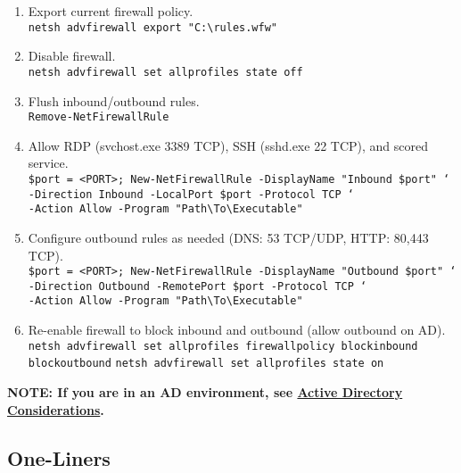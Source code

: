 \documentclass[12pt,letterpaper]{article}
\def\code#1{\textcolor{iris}{\texttt{#1}}}
\def\bf#1{\textbf{#1}}
\begin{document}
\begin{enumerate}
\begin{enumerate}
			\item Export current firewall policy. \\
				\code{netsh advfirewall export "C:\textbackslash{}rules.wfw"}
			\item Disable firewall. \\
				\code{netsh advfirewall set allprofiles state off}
			\item Flush inbound/outbound rules. \\
				\code{Remove-NetFirewallRule}
			\item Allow RDP (svchost.exe 3389 TCP), SSH (sshd.exe 22 TCP), and scored service. \\
				\code{\$port = <PORT>; New-NetFirewallRule -DisplayName "Inbound \$port" ` \\
				-Direction Inbound -LocalPort \$port -Protocol TCP ` \\
				-Action Allow -Program "Path\textbackslash{}To\textbackslash{}Executable"}
			\item Configure outbound rules as needed (DNS: 53 TCP/UDP, HTTP: 80,443 TCP). \\
				\code{\$port = <PORT>; New-NetFirewallRule -DisplayName "Outbound \$port" ` \\
				-Direction Outbound -RemotePort \$port -Protocol TCP ` \\
				-Action Allow -Program "Path\textbackslash{}To\textbackslash{}Executable"}
			\item Re-enable firewall to block inbound and outbound (allow outbound on AD). \\
				\code{netsh advfirewall set allprofiles firewallpolicy blockinbound blockoutbound}
				\code{netsh advfirewall set allprofiles state on}
		\end{enumerate}
	\bf{NOTE: If you are in an AD environment, see \hyperref[subsec:adcon]{Active Directory Considerations}.}
\end{enumerate}

\subsection{One-Liners}
\label{subsec:woliner}
\end{document}
